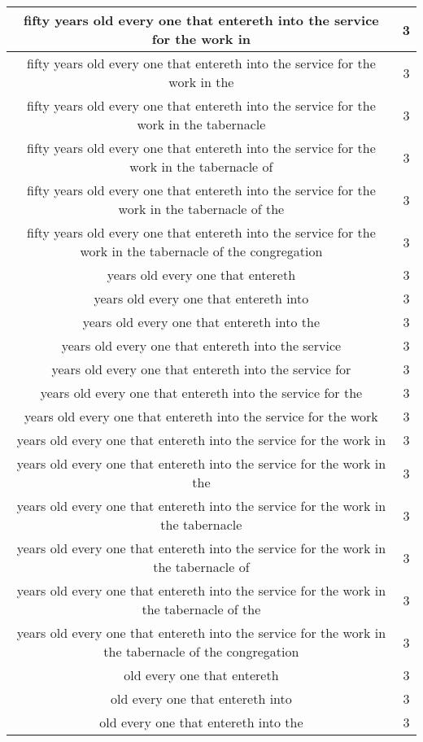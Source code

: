 \begin{center}
\begin{longtable}{|c|c|}
fifty years old every one that entereth into the service for the work in & 3\\ \hline 
fifty years old every one that entereth into the service for the work in the & 3\\ \hline 
fifty years old every one that entereth into the service for the work in the tabernacle & 3\\ \hline 
fifty years old every one that entereth into the service for the work in the tabernacle of & 3\\ \hline 
fifty years old every one that entereth into the service for the work in the tabernacle of the & 3\\ \hline 
fifty years old every one that entereth into the service for the work in the tabernacle of the congregation & 3\\ \hline 
years old every one that entereth & 3\\ \hline 
years old every one that entereth into & 3\\ \hline 
years old every one that entereth into the & 3\\ \hline 
years old every one that entereth into the service & 3\\ \hline 
years old every one that entereth into the service for & 3\\ \hline 
years old every one that entereth into the service for the & 3\\ \hline 
years old every one that entereth into the service for the work & 3\\ \hline 
years old every one that entereth into the service for the work in & 3\\ \hline 
years old every one that entereth into the service for the work in the & 3\\ \hline 
years old every one that entereth into the service for the work in the tabernacle & 3\\ \hline 
years old every one that entereth into the service for the work in the tabernacle of & 3\\ \hline 
years old every one that entereth into the service for the work in the tabernacle of the & 3\\ \hline 
years old every one that entereth into the service for the work in the tabernacle of the congregation & 3\\ \hline 
old every one that entereth & 3\\ \hline 
old every one that entereth into & 3\\ \hline 
old every one that entereth into the & 3\\ \hline 

\end{longtable}
\end{center}
